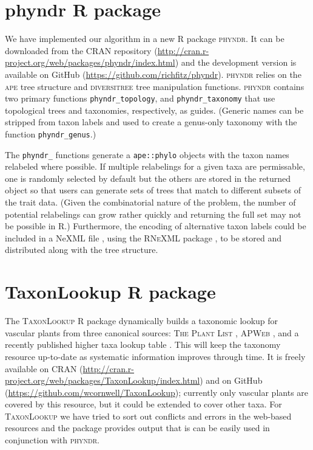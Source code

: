 \documentclass[a4paper,11pt]{article}
\begin{document}
\section{phyndr R package}

We have implemented our algorithm in a new R package \textsc{phyndr}. It can be downloaded from the CRAN repository (\url{http://cran.r-project.org/web/packages/phyndr/index.html}) and the development version is available on GitHub (\url{https://github.com/richfitz/phyndr}). \textsc{phyndr} relies on the \textsc{ape} \citep{ape} tree structure and \textsc{diversitree} \citep{FitzJohn2012} tree manipulation functions. \textsc{phyndr} contains two primary functions \texttt{phyndr\_topology}, and \texttt{phyndr\_taxonomy} that use topological trees and taxonomies, respectively, as guides. (Generic names can be stripped from taxon labels and used to create a genus-only taxonomy with the function \texttt{phyndr\_genus}.) 

The \texttt{phyndr\_} functions generate a \texttt{ape::phylo} objects with the taxon names relabeled where possible. If multiple relabelings for a given taxa are permissable, one is randomly selected by default but the others are stored in the returned object so that users can generate sets of trees that match to different subsets of the trait data. (Given the combinatorial nature of the problem, the number of potential relabelings can grow rather quickly and returning the full set may not be possible in R.) Furthermore, the encoding of alternative taxon labels could be included in a NeXML file \citep{nexml}, using the \textsc{RNeXML} package \citep{rnexml}, to be stored and distributed along with the tree structure.

\section{TaxonLookup R package}

The \textsc{TaxonLookup} R package dynamically builds a taxonomic lookup for vascular plants from three canonical sources: \textsc{The Plant List} \citep{ThePlantList}, \textsc{APWeb} \citep{apweb}, and a recently published higher taxa lookup table \citep[][compiled by D.C. Tank, J.M. Eastman, J.M. Beaulieu, W.K. Cornwell, P.F. Stevens, and A.E. Zanne]{ZanneDryad}.  This will keep the taxonomy resource up-to-date as systematic information improves through time.  It is freely available on CRAN  (\url{http://cran.r-project.org/web/packages/TaxonLookup/index.html}) and on GitHub (\url{https://github.com/wcornwell/TaxonLookup}); currently only vascular plants are covered by this resource, but it could be extended to cover other taxa. For \textsc{TaxonLookup} we have tried to sort out conflicts and errors in the web-based resources and the package provides output that is can be easily used in conjunction with \textsc{phyndr}.
\end{document}
